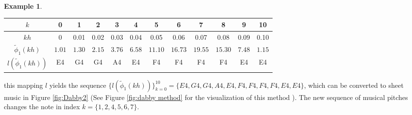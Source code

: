 \documentclass[11pt]{article}
\theoremstyle{definition}
\newtheorem{example}[theorem]{Example}
\begin{document}
\begin{example}
\begin{center}
\begin{tabular}{|c||c|c|c|c|c|c|c|c|c|c|c|}
\hline
$k$ & 0 & 1 & 2 & 3 & 4 & 5 & 6 & 7 & 8 & 9 & 10 \\
\hline
$kh$ & 0 & 0.01 & 0.02 & 0.03 & 0.04 & 0.05 & 0.06 & 0.07 & 0.08 & 0.09 & 0.10 \\
\hline
$\tilde{\phi}_1(kh)$ & $1.01$ & $1.30$ & $2.15$ & $3.76$ & $6.58$ & $11.10$ & $16.73$ & $19.55$ & $15.30$ & $7.48$ & $1.15$ \\
\hline
$l(\tilde{\phi}_1(kh))$ & E4 & G4 & G4 & A4 & E4 & F4 & F4 & F4 & F4 & E4 & E4  \\
\hline
\end{tabular}
\end{center}
this mapping $l$ yields the sequence $ \{ l(\tilde{\phi}_1(kh)) \}_{k = 0}^{10} = \{E4, G4, G4, A4, E4, F4, F4, F4, F4, E4, E4 \}$, which can be converted to sheet music in Figure \ref{fig:Dabby2} (See Figure \ref{fig:dabby method} for the visualization of this method ). The new sequence of musical pitches changes the note in index $k = \{1, 2, 4, 5, 6, 7\}$.

\end{example}
\end{document}
